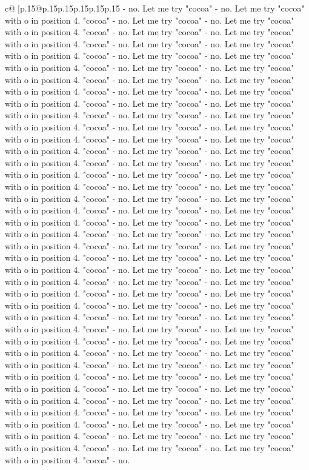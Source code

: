 \documentclass{article}
\begin{document}
{\begin{supertabular}{c@{$\;$}|p{.15\linewidth}@{}p{.15\linewidth}p{.15\linewidth}p{.15\linewidth}p{.15\linewidth}p{.15\linewidth}}
{{{{-} no. Let me try "cocoa" {-} no. Let me try "cocoa" with o in position 4. "cocoa" {-} no. Let me try "cocoa" {-} no. Let me try "cocoa" with o in position 4. "cocoa" {-} no. Let me try "cocoa" {-} no. Let me try "cocoa" with o in position 4. "cocoa" {-} no. Let me try "cocoa" {-} no. Let me try "cocoa" with o in position 4. "cocoa" {-} no. Let me try "cocoa" {-} no. Let me try "cocoa" with o in position 4. "cocoa" {-} no. Let me try "cocoa" {-} no. Let me try "cocoa" with o in position 4. "cocoa" {-} no. Let me try "cocoa" {-} no. Let me try "cocoa" with o in position 4. "cocoa" {-} no. Let me try "cocoa" {-} no. Let me try "cocoa" with o in position 4. "cocoa" {-} no. Let me try "cocoa" {-} no. Let me try "cocoa" with o in position 4. "cocoa" {-} no. Let me try "cocoa" {-} no. Let me try "cocoa" with o in position 4. "cocoa" {-} no. Let me try "cocoa" {-} no. Let me try "cocoa" with o in position 4. "cocoa" {-} no. Let me try "cocoa" {-} no. Let me try "cocoa" with o in position 4. "cocoa" {-} no. Let me try "cocoa" {-} no. Let me try "cocoa" with o in position 4. "cocoa" {-} no. Let me try "cocoa" {-} no. Let me try "cocoa" with o in position 4. "cocoa" {-} no. Let me try "cocoa" {-} no. Let me try "cocoa" with o in position 4. "cocoa" {-} no. Let me try "cocoa" {-} no. Let me try "cocoa" with o in position 4. "cocoa" {-} no. Let me try "cocoa" {-} no. Let me try "cocoa" with o in position 4. "cocoa" {-} no. Let me try "cocoa" {-} no. Let me try "cocoa" with o in position 4. "cocoa" {-} no. Let me try "cocoa" {-} no. Let me try "cocoa" with o in position 4. "cocoa" {-} no. Let me try "cocoa" {-} no. Let me try "cocoa" with o in position 4. "cocoa" {-} no. Let me try "cocoa" {-} no. Let me try "cocoa" with o in position 4. "cocoa" {-} no. Let me try "cocoa" {-} no. Let me try "cocoa" with o in position 4. "cocoa" {-} no. Let me try "cocoa" {-} no. Let me try "cocoa" with o in position 4. "cocoa" {-} no. Let me try "cocoa" {-} no. Let me try "cocoa" with o in position 4. "cocoa" {-} no. Let me try "cocoa" {-} no. Let me try "cocoa" with o in position 4. "cocoa" {-} no. Let me try "cocoa" {-} no. Let me try "cocoa" with o in position 4. "cocoa" {-} no. Let me try "cocoa" {-} no. Let me try "cocoa" with o in position 4. "cocoa" {-} no. Let me try "cocoa" {-} no. Let me try "cocoa" with o in position 4. "cocoa" {-} no. Let me try "cocoa" {-} no. Let me try "cocoa" with o in position 4. "cocoa" {-} no. Let me try "cocoa" {-} no. Let me try "cocoa" with o in position 4. "cocoa" {-} no. Let me try "cocoa" {-} no. Let me try "cocoa" with o in position 4. "cocoa" {-} no. Let me try "cocoa" {-} no. Let me try "cocoa" with o in position 4. "cocoa" {-} no. Let me try "cocoa" {-} no. Let me try "cocoa" with o in position 4. "cocoa" {-} no. Let me try "cocoa" {-} no. Let me try "cocoa" with o in position 4. "cocoa" {-} no. Let me try "cocoa" {-} no. Let me try "cocoa" with o in position 4. "cocoa" {-} no. Let me try "cocoa" {-} no. Let me try "cocoa" with o in position 4. "cocoa" {-} no. Let me try "cocoa" {-} no. Let me try "cocoa" with o in position 4. "cocoa" {-} no. Let me try "cocoa" {-} no. Let me try "cocoa" with o in position 4. "cocoa" {-} no. }}}
\end{supertabular}}
\end{document}

